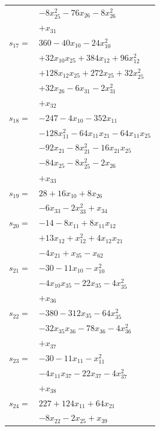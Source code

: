 \begin{longtable}{@{}r@{\;}l@{}}
 & \(\displaystyle -8x_{25}^{2} -76x_{26} -8x_{26}^{2}\) \\
 & \(\displaystyle +x_{31}\) \\[3pt]
\(s_{17}=\) & \(\displaystyle 360 -40x_{10} -24x_{10}^{2}\) \\
 & \(\displaystyle +32x_{10}x_{25} +384x_{12} +96x_{12}^{2}\) \\
 & \(\displaystyle +128x_{12}x_{25} +272x_{25} +32x_{25}^{2}\) \\
 & \(\displaystyle +32x_{26} -6x_{31} -2x_{31}^{2}\) \\
 & \(\displaystyle +x_{32}\) \\[3pt]
\(s_{18}=\) & \(\displaystyle -247 -4x_{10} -352x_{11}\) \\
 & \(\displaystyle -128x_{11}^{2} -64x_{11}x_{21} -64x_{11}x_{25}\) \\
 & \(\displaystyle -92x_{21} -8x_{21}^{2} -16x_{21}x_{25}\) \\
 & \(\displaystyle -84x_{25} -8x_{25}^{2} -2x_{26}\) \\
 & \(\displaystyle +x_{33}\) \\[3pt]
\(s_{19}=\) & \(\displaystyle 28 +16x_{10} +8x_{26}\) \\
 & \(\displaystyle -6x_{33} -2x_{33}^{2} +x_{34}\) \\[3pt]
\(s_{20}=\) & \(\displaystyle -14 -8x_{11} +8x_{11}x_{12}\) \\
 & \(\displaystyle +13x_{12} +x_{12}^{2} +4x_{12}x_{21}\) \\
 & \(\displaystyle -4x_{21} +x_{35} -x_{62}\) \\[3pt]
\(s_{21}=\) & \(\displaystyle -30 -11x_{10} -x_{10}^{2}\) \\
 & \(\displaystyle -4x_{10}x_{35} -22x_{35} -4x_{35}^{2}\) \\
 & \(\displaystyle +x_{36}\) \\[3pt]
\(s_{22}=\) & \(\displaystyle -380 -312x_{35} -64x_{35}^{2}\) \\
 & \(\displaystyle -32x_{35}x_{36} -78x_{36} -4x_{36}^{2}\) \\
 & \(\displaystyle +x_{37}\) \\[3pt]
\(s_{23}=\) & \(\displaystyle -30 -11x_{11} -x_{11}^{2}\) \\
 & \(\displaystyle -4x_{11}x_{37} -22x_{37} -4x_{37}^{2}\) \\
 & \(\displaystyle +x_{38}\) \\[3pt]
\(s_{24}=\) & \(\displaystyle 227 +124x_{11} +64x_{21}\) \\
 & \(\displaystyle -8x_{22} -2x_{25} +x_{39}\) \\[3pt]

\end{longtable}
